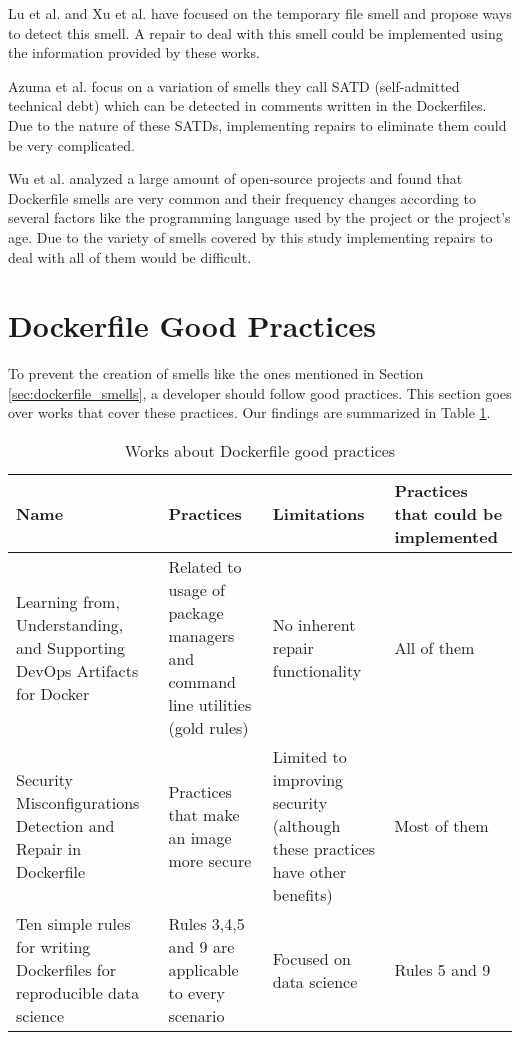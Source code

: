 Lu et al. \cite{luEmpiricalCaseStudy2019} and Xu et al. \cite{xuDockerfileTFSmell2019} have focused on the temporary file smell and propose ways to detect this smell. A repair to deal with this smell could be implemented using the information provided by these works.

Azuma et al. \cite{azumaEmpiricalStudySelfadmitted2022} focus on a variation of smells they call SATD (self-admitted technical debt) which can be detected in comments written in the Dockerfiles. Due to the nature of these SATDs, implementing repairs to eliminate them could be very complicated.

Wu et al. \cite{wuCharacterizingOccurrenceDockerfile2020} analyzed a large amount of open-source projects and found that Dockerfile smells are very common and their frequency changes according to several factors like the programming language used by the project or the project's age. Due to the variety of smells covered by this study implementing repairs to deal with all of them would be difficult. 

\section{Dockerfile Good Practices} \label{sec:dockerfile_good_practices}

To prevent the creation of smells like the ones mentioned in Section \ref{sec:dockerfile_smells}, a developer should follow good practices. This section goes over works that cover these practices. Our findings are summarized in Table \ref{tab:works_dockerfile_good_practices}.

\begin{table}[H]
    \centering
    \begin{tabular}{|p{}|p{}|p{}|p{}|}
        \hline \textbf{Name} & \textbf{Practices} & \textbf{Limitations} & \textbf{Practices that could be implemented} \\
        \hline Learning from, Understanding, and Supporting DevOps Artifacts for Docker \cite{henkelLearningUnderstandingSupporting2020} & Related to usage of package managers and command line utilities (gold rules) & No inherent repair functionality & All of them \\
        \hline Security Misconfigurations Detection and Repair in Dockerfile \cite{prinettoSecurityMisconfigurationsDetection} & Practices that make an image more secure & Limited to improving security (although these practices have other benefits) & Most of them \\
        \hline Ten simple rules for writing Dockerfiles for reproducible data science \cite{nustTenSimpleRules2020} & Rules 3,4,5 and 9 are applicable to every scenario & Focused on data science & Rules 5 and 9 \\
        \hline
    \end{tabular} 
    \caption{Works about Dockerfile good practices}
    \label{tab:works_dockerfile_good_practices}
\end{table}


